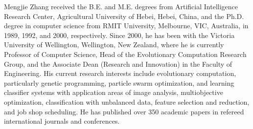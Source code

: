 \documentclass[10pt,journal,compsoc]{IEEEtran}
\begin{document}
\vspace{-3em}
\begin{IEEEbiography}{Mengjie Zhang}
received the B.E. and M.E. degrees from Artificial Intelligence Research Center, Agricultural University of Hebei, Hebei, China, and the Ph.D. degree in computer science from RMIT
University, Melbourne, VIC, Australia, in 1989, 1992, and 2000, respectively.
Since 2000, he has been with the Victoria University of Wellington, Wellington, New Zealand, where he is currently Professor of Computer Science, Head of the Evolutionary Computation Research Group, and the Associate Dean (Research and Innovation) in the Faculty of Engineering.
His current research interests include evolutionary computation, particularly genetic programming, particle swarm optimization, and learning classifier systems with application areas of image analysis, multiobjective optimization, classification with unbalanced data, feature selection and reduction, and job shop scheduling. 
He has published over 350 academic papers in refereed international journals
and conferences.


\end{IEEEbiography} 
\end{document}
